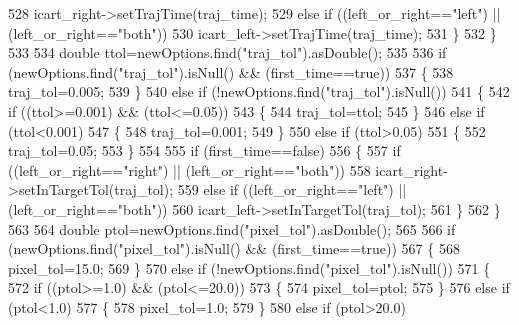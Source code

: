 \begin{DoxyCode}
528                 icart\_right->setTrajTime(traj\_time);
529             \textcolor{keywordflow}{else} \textcolor{keywordflow}{if} ((left\_or\_right==\textcolor{stringliteral}{"left"}) || (left\_or\_right==\textcolor{stringliteral}{"both"}))
530                 icart\_left->setTrajTime(traj\_time);
531         \}
532     \}
533 
534     \textcolor{keywordtype}{double} ttol=newOptions.find(\textcolor{stringliteral}{"traj\_tol"}).asDouble();
535 
536     \textcolor{keywordflow}{if} (newOptions.find(\textcolor{stringliteral}{"traj\_tol"}).isNull() && (first\_time==\textcolor{keyword}{true}))
537     \{
538         traj\_tol=0.005;
539     \}
540     \textcolor{keywordflow}{else} \textcolor{keywordflow}{if} (!newOptions.find(\textcolor{stringliteral}{"traj\_tol"}).isNull())
541     \{
542         \textcolor{keywordflow}{if} ((ttol>=0.001) && (ttol<=0.05))
543         \{
544             traj\_tol=ttol;
545         \}
546         \textcolor{keywordflow}{else} \textcolor{keywordflow}{if} (ttol<0.001)
547         \{
548             traj\_tol=0.001;
549         \}
550         \textcolor{keywordflow}{else} \textcolor{keywordflow}{if} (ttol>0.05)
551         \{
552             traj\_tol=0.05;
553         \}
554 
555         \textcolor{keywordflow}{if} (first\_time==\textcolor{keyword}{false})
556         \{
557             \textcolor{keywordflow}{if} ((left\_or\_right==\textcolor{stringliteral}{"right"}) || (left\_or\_right==\textcolor{stringliteral}{"both"}))
558                 icart\_right->setInTargetTol(traj\_tol);
559             \textcolor{keywordflow}{else} \textcolor{keywordflow}{if} ((left\_or\_right==\textcolor{stringliteral}{"left"}) || (left\_or\_right==\textcolor{stringliteral}{"both"}))
560                 icart\_left->setInTargetTol(traj\_tol);
561         \}
562     \}
563 
564     \textcolor{keywordtype}{double} ptol=newOptions.find(\textcolor{stringliteral}{"pixel\_tol"}).asDouble();
565 
566     \textcolor{keywordflow}{if} (newOptions.find(\textcolor{stringliteral}{"pixel\_tol"}).isNull() && (first\_time==\textcolor{keyword}{true}))
567     \{
568         pixel_tol=15.0;
569     \}
570     \textcolor{keywordflow}{else} \textcolor{keywordflow}{if} (!newOptions.find(\textcolor{stringliteral}{"pixel\_tol"}).isNull())
571     \{
572         \textcolor{keywordflow}{if} ((ptol>=1.0) && (ptol<=20.0))
573         \{
574             pixel_tol=ptol;
575         \}
576         \textcolor{keywordflow}{else} \textcolor{keywordflow}{if} (ptol<1.0)
577         \{
578             pixel_tol=1.0;
579         \}
580         \textcolor{keywordflow}{else} \textcolor{keywordflow}{if} (ptol>20.0)

\end{DoxyCode}
